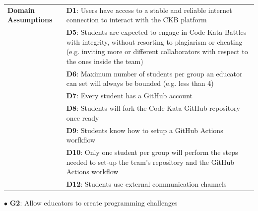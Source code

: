 \begin{center}
\begin{tabular}{ |m{3cm}|m{10cm}| }
        \hline
    \end{tabular}
    \begin{tabular}{ |m{3cm}|m{10cm}| }
        \hline
        \textbf{Domain \newline Assumptions} 
        & \textbf{D1}: Users have access to a stable and reliable internet connection to interact with the CKB platform \\
        & \textbf{D5}: Students are expected to engage in Code Kata Battles with integrity, without resorting to plagiarism or cheating (e.g. inviting more or different collaborators with respect to the ones inside the team) \\
        & \textbf{D6}: Maximum number of students per group an educator can set will always be bounded (e.g. less than 4) \\
        & \textbf{D7}: Every student has a GitHub account \\
        & \textbf{D8}: Students will fork the Code Kata GitHub repository once ready \\
        & \textbf{D9}: Students know how to setup a GitHub Actions worfkflow \\
        & \textbf{D10}: Only one student per group will perform the steps needed to set-up the team's repository and the GitHub Actions workflow \\
        & \textbf{D12}: Students use external communication channels \\
        \hline
    \end{tabular}
\end{center}
\newpage
$\bullet$ \textbf{G2}: Allow educators to create programming challenges
